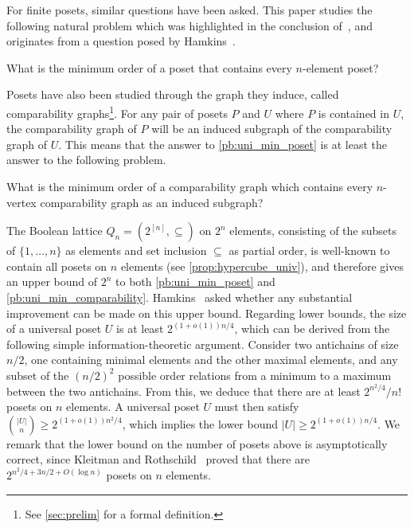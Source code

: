 \documentclass[11pt]{article}
\newcommand{\1}{\mathbbm{1}}
\begin{document}
For finite posets, similar questions have been asked. This paper studies the following natural problem which was highlighted in the conclusion of~\cite{BonamyEsperetGroenlandScott21}, and originates from a question posed by Hamkins~\cite{MOquestion}.
\begin{problem}
\label{pb:uni_min_poset}
    What is the minimum order of a poset that contains every $n$-element poset? 
\end{problem}



Posets have also been studied through the graph they induce, called comparability graphs\footnote{See \cref{sec:prelim} for a formal definition.}. 
For any pair of posets $P$ and $U$ where $P$ is contained in $U$, the comparability graph of $P$ will be an induced subgraph of the comparability graph of $U$. This means that the answer to \cref{pb:uni_min_poset} is at least the answer to the following problem.
\begin{problem}
    \label{pb:uni_min_comparability}
    What is the minimum order of a comparability graph which contains every $n$-vertex comparability graph as an induced subgraph?
\end{problem}

The Boolean lattice $Q_n=(2^{[n]},\subseteq)$ on $2^n$ elements, consisting of the subsets of $\{1,\dots,n\}$ as elements and set inclusion $\subseteq$ as partial order, is well-known to contain all posets on $n$ elements (see \cref{prop:hypercube_univ}), and therefore gives an upper bound of $2^n$ to both \cref{pb:uni_min_poset} and \cref{pb:uni_min_comparability}. Hamkins~\cite{MOquestion} asked whether any substantial improvement can be made on this upper bound. Regarding lower bounds, the size of a universal poset $U$ is at least $2^{(1+o(1)) n/4}$, which can be derived from the following simple information-theoretic argument. Consider two antichains of size $n/2$, one containing minimal elements and the other maximal elements, and any subset of the $(n/2)^2$ possible order relations from a minimum to a maximum between the two antichains. From this, we deduce that there are at least $2^{n^2/4}/n!$ posets on $n$ elements.  A universal poset $U$ must then satisfy $\binom{|U|}{n} \geq 2^{(1+o(1))n^2/4}$, which implies the lower bound $|U|\geq 2^{(1+o(1))n/4}$. We remark that the lower bound on the number of posets above is asymptotically correct, since Kleitman and Rothschild~\cite{KleitmanRothschild75} proved that there are $2^{n^2/4 +3n/2+O(\log n)}$ posets on $n$ elements.
\end{document}
